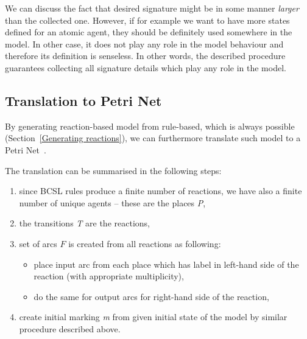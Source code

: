 \documentclass[12pt, twoside]{fithesis2} %
\newenvironment{proof}{\noindent\emph{Proof:~ }\nopagebreak \begin{itshape}}{\end{itshape}\bigskip}
\newcommand*{\QEDA}{\hfill\ensuremath{\blacksquare}}%
\begin{document}
We can discuss the fact that desired signature might be in some manner \emph{larger} than the collected one. However, if for example we want to have more states defined for an atomic agent, they should be definitely used somewhere in the model. In other case, it does not play any role in the model behaviour and therefore its definition is senseless. In other words, the described procedure guarantees collecting all signature details which play any role in the model.


\subsection{Translation to Petri Net}

By generating reaction-based model from rule-based, which is always possible (Section~\ref{Generating reactions}), we can furthermore translate such model to a Petri Net~\cite{petri}.

The translation can be summarised in the following steps: 

\begin{enumerate}
\item since BCSL rules produce a finite number of reactions, we have also a finite number of unique agents -- these are the places \emph{P},
\item the transitions \emph{T} are the reactions,
\item set of arcs $F$ is created from all reactions as following:
\begin{itemize}
  \item place input arc from each place which has label in left-hand side of the reaction (with appropriate multiplicity),
  \item do the same for output arcs for right-hand side of the reaction,
\end{itemize}
\item create initial marking \emph{m} from given initial state of the model by similar procedure described above.
\end{enumerate}
\end{document}
